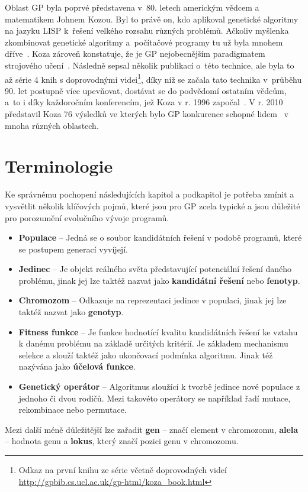 Oblast GP byla poprvé představena v~80. letech americkým vědcem a matematikem Johnem Kozou. Byl to právě on, kdo aplikoval genetické algoritmy na jazyku LISP k~řešení velkého rozsahu různých problémů. Ačkoliv myšlenka zkombinovat genetické algoritmy a~počítačové programy tu už byla mnohem dříve~\cite{wiki:Genetic_programming}. Koza zároveň konstatuje, že je GP nejobecnějším paradigmatem strojového učení~\cite{NatSelectionGP}. Následně sepsal několik publikací o~této technice, ale byla to až série 4 knih s doprovodnými videi\footnote{Odkaz na první knihu ze série  včetně doprovodných videí \url{http://gpbib.cs.ucl.ac.uk/gp-html/koza_book.html}}, díky níž se začala tato technika  v~průběhu 90. let postupně více upevňovat, dostávat se do podvědomí ostatním vědcům, a~to i díky každoročním konferencím, jež Koza v r. 1996 započal~\cite{wiki:Genetic_programming}. V r. 2010 představil Koza 76 výsledků ve kterých bylo GP konkurence schopné lidem~\cite{Koza:2010:GPEM} v mnoha různých oblastech. 

\section{Terminologie}
Ke správnému pochopení následujících kapitol a podkapitol je potřeba zmínit a vysvětlit několik klíčových pojmů, které jsou pro GP zcela typické a jsou důležité pro porozumění evolučního vývoje programů. 
\begin{itemize}
    \item \textbf{Populace} -- Jedná se o soubor kandidátních řešení v podobě programů, které se postupem generací vyvíjejí.
    \item \textbf{Jedinec} -- Je objekt reálného světa představující potenciální řešení daného problému, jinak jej lze taktéž nazvat jako \textbf{kandidátní řešení} nebo \textbf{fenotyp}.
     \item \textbf{Chromozom} -- Odkazuje na reprezentaci jedince v populaci, jinak jej lze taktéž nazvat jako \textbf{genotyp}.
    \item \textbf{Fitness funkce} -- Je funkce hodnotící kvalitu kandidátních řešení ke vztahu k danému problému na základě určitých kritérií. Je základem mechanismu selekce a slouží taktéž jako ukončovací podmínka algoritmu. Jinak též nazývána jako \textbf{účelová funkce}.
    \item \textbf{Genetický operátor} -- Algoritmus sloužící k tvorbě jedince nové populace z jednoho či dvou rodičů. Mezi takovéto operátory se například řadí mutace, rekombinace nebo permutace. 
\end{itemize}
Mezi další méně důležitější lze zařadit \textbf{gen} -- značí element v chromozomu, \textbf{alela} -- hodnota genu a \textbf{lokus}, který značí pozici genu v chromozomu.

